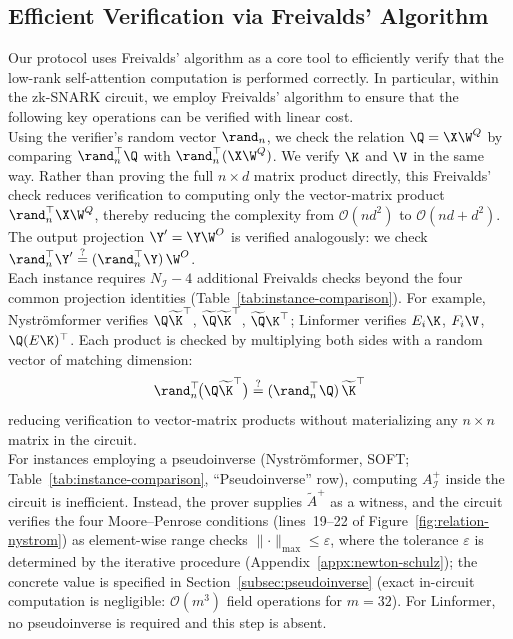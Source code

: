 \subsection{Efficient Verification via Freivalds' Algorithm}
\label{moore-penrose}
Our protocol uses Freivalds' algorithm as a core tool to efficiently verify that the low-rank self-attention computation is performed correctly. In particular, within the zk-SNARK circuit, we employ Freivalds' algorithm to ensure that the following key operations can be verified with linear cost. \\

Using the verifier's random vector $\rand_n$, we check the relation $\Q = \X \W^Q$ by comparing $\rand_n^{\top} \Q$ with $\rand_n^{\top}(\X \W^Q)$.
We verify $\K$ and $\V$ in the same way. Rather than proving the full $n\times d$ matrix product directly, this Freivalds' check reduces verification to computing only the vector-matrix product $\rand_n^{\top}\X \W^Q$, thereby reducing the complexity from $\mathcal{O}(n d^2)$ to $\mathcal{O}(nd + d^2)$. The output projection $\Y'=\Y \W^O$ is verified analogously: we check $\rand_n^{\top}\Y' \stackrel{?}{=} (\rand_n^{\top}\Y)\,\W^O$. \\

Each instance requires $N_{\mathcal{I}}{-}4$ additional Freivalds checks beyond the four common projection identities (Table~\ref{tab:instance-comparison}). For example, Nystr\"{o}mformer verifies $\Q\widetilde{\K}^{\top}$, $\widetilde{\Q}\widetilde{\K}^{\top}$, $\widetilde{\Q}\K^{\top}$; Linformer verifies $E_i\K$, $F_i\V$, $\Q(E\K)^{\top}$. Each product is checked by multiplying both sides with a random vector of matching dimension:
\[
\rand_n^{\top}\!\bigl(\Q\widetilde{\K}^{\top}\bigr)
\stackrel{?}{=}
(\rand_n^{\top}\Q)\,\widetilde{\K}^{\top}
\]
reducing verification to vector-matrix products without materializing any $n \times n$ matrix in the circuit. \\

For instances employing a pseudoinverse (Nystr\"{o}mformer, SOFT; Table~\ref{tab:instance-comparison}, ``Pseudoinverse'' row), computing $A_\mathcal{I}^{+}$ inside the circuit is inefficient. Instead, the prover supplies $\tilde{A}^{+}$ as a witness, and the circuit verifies the four Moore--Penrose conditions (lines~19--22 of Figure~\ref{fig:relation-nystrom}) as element-wise range checks $\lVert\cdot\rVert_{\max}\leq\varepsilon$, where the tolerance $\varepsilon$ is determined by the iterative procedure (Appendix~\ref{appx:newton-schulz}); the concrete value is specified in Section~\ref{subsec:pseudoinverse} (exact in-circuit computation is negligible: $\mathcal{O}(m^3)$ field operations for $m{=}32$). For Linformer, no pseudoinverse is required and this step is absent.

